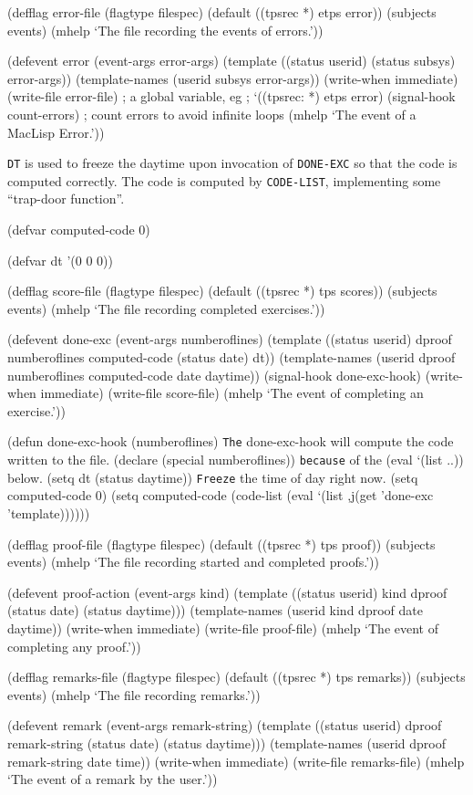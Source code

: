 \begin{tpsexample}

(defflag error-file
  (flagtype filespec)
  (default ((tpsrec *) etps error))
  (subjects events)
  (mhelp `The file recording the events of errors.'))

(defevent error
  (event-args error-args)
  (template ((status userid) (status subsys) error-args))
  (template-names (userid subsys error-args))
  (write-when immediate)
  (write-file error-file)    ; a global variable, eg
			     ; `((tpsrec: *) etps error)
  (signal-hook count-errors) ; count errors to avoid infinite loops
  (mhelp `The event of a MacLisp Error.'))

{\rm 
{\tt DT} is used to freeze the daytime upon invocation of {\tt DONE-EXC} so that the code is computed correctly.
The code is computed by {\tt CODE-LIST}, implementing some ``trap-door function''.}

(defvar computed-code 0)

(defvar dt '(0 0 0))

(defflag score-file
  (flagtype filespec)
  (default ((tpsrec *) tps scores))
  (subjects events)
  (mhelp `The file recording completed exercises.'))

(defevent done-exc
  (event-args numberoflines)
  (template ((status userid) dproof numberoflines computed-code
			     (status date) dt))
  (template-names (userid dproof numberoflines computed-code date daytime))
  (signal-hook done-exc-hook)
  (write-when immediate)
  (write-file score-file)
  (mhelp `The event of completing an exercise.'))

(defun done-exc-hook (numberoflines)
  {\tt  The} done-exc-hook will compute the code written to the file.
  (declare (special numberoflines))
  {\tt  because} of the (eval `(list ..)) below.
  (setq dt (status daytime))
  {\tt  Freeze} the time of day right now.
  (setq computed-code 0)
  (setq computed-code (code-list (eval `(list ,j(get 'done-exc 'template))))))

(defflag proof-file
  (flagtype filespec)
  (default ((tpsrec *) tps proof))
  (subjects events)
  (mhelp `The file recording started and completed proofs.'))

(defevent proof-action
  (event-args kind)
  (template ((status userid) kind dproof
			     (status date) (status daytime)))
  (template-names (userid kind dproof date daytime))
  (write-when immediate)
  (write-file proof-file)
  (mhelp `The event of completing any proof.'))

(defflag remarks-file
  (flagtype filespec)
  (default ((tpsrec *) tps remarks))
  (subjects events)
  (mhelp `The file recording remarks.'))

(defevent remark
  (event-args remark-string)
  (template ((status userid) dproof remark-string
			     (status date) (status daytime)))
  (template-names (userid dproof remark-string date time))
  (write-when immediate)
  (write-file remarks-file)
  (mhelp `The event of a remark by the user.'))

\end{tpsexample}

